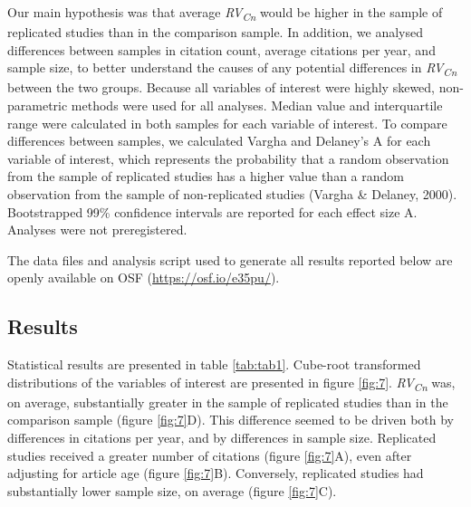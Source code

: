 \documentclass[
  english,
  jou,floatsintext]{apa6}
\begin{document}
Our main hypothesis was that average \emph{RV\textsubscript{Cn}} would be higher in the sample of replicated studies than in the comparison sample. In addition, we analysed differences between samples in citation count, average citations per year, and sample size, to better understand the causes of any potential differences in \emph{RV\textsubscript{Cn}} between the two groups. Because all variables of interest were highly skewed, non-parametric methods were used for all analyses. Median value and interquartile range were calculated in both samples for each variable of interest. To compare differences between samples, we calculated Vargha and Delaney's A for each variable of interest, which represents the probability that a random observation from the sample of replicated studies has a higher value than a random observation from the sample of non-replicated studies (Vargha \& Delaney, 2000). Bootstrapped 99\% confidence intervals are reported for each effect size A. Analyses were not preregistered.

The data files and analysis script used to generate all results reported below are openly available on OSF (\url{https://osf.io/e35pu/}).

\hypertarget{results}{%
\subsection{Results}\label{results}}

Statistical results are presented in table \ref{tab:tab1}. Cube-root transformed distributions of the variables of interest are presented in figure \ref{fig:7}. \emph{RV\textsubscript{Cn}} was, on average, substantially greater in the sample of replicated studies than in the comparison sample (figure \ref{fig:7}D). This difference seemed to be driven both by differences in citations per year, and by differences in sample size. Replicated studies received a greater number of citations (figure \ref{fig:7}A), even after adjusting for article age (figure \ref{fig:7}B). Conversely, replicated studies had substantially lower sample size, on average (figure \ref{fig:7}C).
\end{document}
